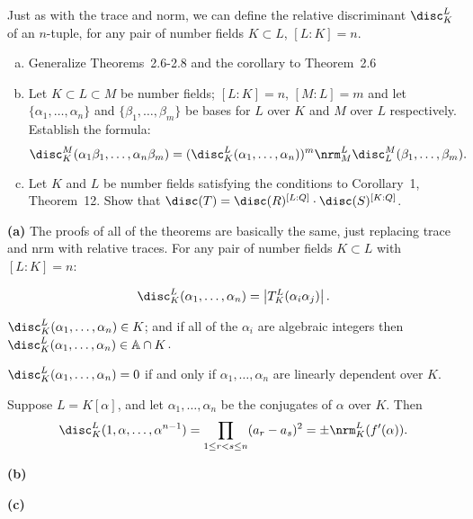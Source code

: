 \documentclass[11pt,letterpaper]{article}
\begin{document}
\begin{cproblem}{2.23}
    Just as with the trace and norm, we can define the relative discriminant $\disc^L_K$  of an $n$-tuple, for any pair of number fields $K\subset L$, $[L : K] = n$.
    \begin{enumerate}[(a)]
        \item Generalize Theorems~2.6-2.8 and the corollary to Theorem~2.6
        \item Let $K\subset L \subset M$ be number fields; $[L : K]=n$, $[M : L]=m$ and let $\{\alpha_1,\ldots,\alpha_n\}$ and $\{\beta_1,\ldots,\beta_m\}$ be bases for $L$ over $K$ and $M$ over $L$ respectively. Establish the formula:
        \[
            \disc^M_K(\alpha_1\beta_1,\ldots,\alpha_n\beta_m) = (\disc^L_K(\alpha_1,\ldots,\alpha_n))^m\nrm^L_M\disc^M_L(\beta_1,\ldots,\beta_m)
        .\] 
        \item Let $K$ and $L$ be number fields satisfying the conditions to Corollary~1, Theorem~12. Show that $\disc(T) = \disc(R)^{[L:Q]}\cdot \disc(S)^{[K :Q]}$. 
    \end{enumerate}
\end{cproblem}

\begin{solution}
    \textbf{(a)} The proofs of all of the theorems are basically the same, just replacing trace and nrm with relative traces. For any pair of number fields $K\subset L$ with $[L:K]=n$: 

    \begin{ctheorem}{2.6}
        \[
            \disc^L_K(\alpha_1,\ldots,\alpha_n)=\left|T^L_K(\alpha_i\alpha_j)\right|
        .\] 
    \end{ctheorem}
    
    \begin{corollary}
        $\disc^L_K(\alpha_1,\ldots,\alpha_n)\in K$; and if all of the $\alpha_i$ are algebraic integers then $\disc^L_K(\alpha_1,\ldots,\alpha_n)\in \mathbb{A}\cap K$.  
    \end{corollary}
    
    \begin{ctheorem}{2.7}
        $\disc^L_K(\alpha_1,\ldots,\alpha_n)=0$ if and only if $\alpha_1,\ldots,\alpha_n$ are linearly dependent over $K$.
    \end{ctheorem}
    
    \begin{ctheorem}{2.8}
        Suppose $L=K[\alpha]$, and let $\alpha_1,\ldots,\alpha_n$ be the conjugates of $\alpha$ over $K$. Then 
        \[
            \disc^L_K(1, \alpha,\ldots,\alpha^{n-1})=\prod_{1\leq r<s\leq n}(a_r-a_s)^2=\pm \nrm^L_K(f'(\alpha))
        .\] 
    \end{ctheorem}
    
    \textbf{(b)}

    \textbf{(c)} 
\end{solution}
\end{document}
